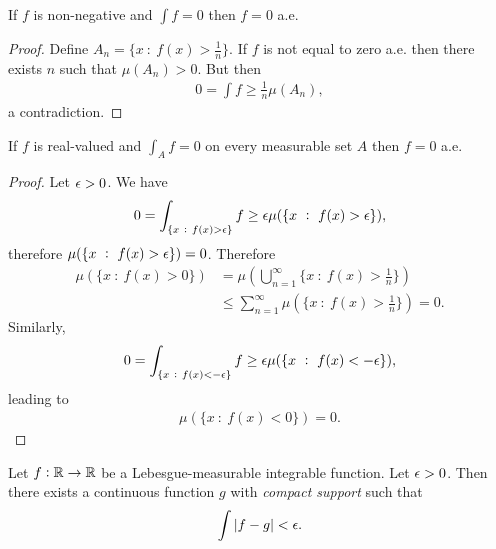 \begin{theorem}
  If $f$ is non-negative and $\int f = 0$ then $f = 0$ a.e.
\end{theorem}

\begin{proof}
  Define $A_n = \{x ~:~ f(x) > \frac{1}{n}\}$. If $f$ is not equal to zero a.e. then there exists $n$ such
  that $\mu(A_n) > 0$. But then
  \begin{align*}
    0 = \int f \geq \frac{1}{n} \mu(A_n),
  \end{align*}
  a contradiction.
\end{proof}


\begin{theorem}
  If $f$ is real-valued and $\int_A f = 0$ on every measurable set $A$ then $f = 0$ a.e.
\end{theorem}

\begin{proof}
  Let $\epsilon > 0$. We have
  \begin{align*}
    0 = \int_{\{x ~:~ f(x) > \epsilon\}} f \geq \epsilon\mu(\{x ~:~ f(x) > \epsilon\}),
  \end{align*}
  therefore $\mu(\{x ~:~ f(x) > \epsilon\}) = 0$. Therefore
  \begin{align*}
    \mu(\{x ~:~ f(x) > 0\})
    &= \mu(\bigcup_{n=1}^\infty \{x ~:~ f(x) > \frac{1}{n}\}) \\
    &\leq \sum_{n=1}^\infty \mu(\{x ~:~ f(x) > \frac{1}{n}\}) = 0.
  \end{align*}
  Similarly,
  \begin{align*}
    0 = \int_{\{x ~:~ f(x) < -\epsilon\}} f \geq \epsilon\mu(\{x ~:~ f(x) < -\epsilon\}),
  \end{align*}
  leading to
  \begin{align*}
    \mu(\{x ~:~ f(x) < 0\}) = 0.
  \end{align*}
\end{proof}



\begin{theorem}
  Let $f: \mathbb{R}\to \mathbb{R}$ be a Lebesgue-measurable integrable function. Let $\epsilon > 0$. Then there exists a
  continuous function $g$ with {\it compact support} such that
  \begin{align*}
    \int |f - g| < \epsilon.
  \end{align*}
\end{theorem}


\begin{theorem}

\end{theorem}

